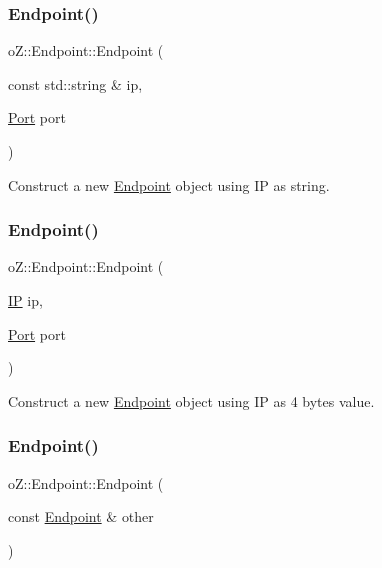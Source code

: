 \subsubsection{\texorpdfstring{Endpoint()}{Endpoint()}\hspace{0.1cm}{\footnotesize\ttfamily [2/4]}}
{\footnotesize\ttfamily o\+Z\+::\+Endpoint\+::\+Endpoint (\begin{DoxyParamCaption}\item[{const std\+::string \&}]{ip,  }\item[{\mbox{\hyperlink{namespaceo_z_afeccb82d451972ba3b7d2a32b066b30b}{Port}}}]{port }\end{DoxyParamCaption})\hspace{0.3cm}{\ttfamily [inline]}}



Construct a new \mbox{\hyperlink{classo_z_1_1_endpoint}{Endpoint}} object using IP as string. 

\mbox{\label{classo_z_1_1_endpoint_a7dd91554b61824eac5e0b015fa12f957}} 
\subsubsection{\texorpdfstring{Endpoint()}{Endpoint()}\hspace{0.1cm}{\footnotesize\ttfamily [3/4]}}
{\footnotesize\ttfamily o\+Z\+::\+Endpoint\+::\+Endpoint (\begin{DoxyParamCaption}\item[{\mbox{\hyperlink{namespaceo_z_ace55c2d0182a14ceea9649d0d0cf9c4a}{IP}}}]{ip,  }\item[{\mbox{\hyperlink{namespaceo_z_afeccb82d451972ba3b7d2a32b066b30b}{Port}}}]{port }\end{DoxyParamCaption})\hspace{0.3cm}{\ttfamily [inline]}}



Construct a new \mbox{\hyperlink{classo_z_1_1_endpoint}{Endpoint}} object using IP as 4 bytes value. 

\mbox{\label{classo_z_1_1_endpoint_a71e0ae21c68532120f0aa6a988594279}} 
\subsubsection{\texorpdfstring{Endpoint()}{Endpoint()}\hspace{0.1cm}{\footnotesize\ttfamily [4/4]}}
{\footnotesize\ttfamily o\+Z\+::\+Endpoint\+::\+Endpoint (\begin{DoxyParamCaption}\item[{const \mbox{\hyperlink{classo_z_1_1_endpoint}{Endpoint}} \&}]{other }\end{DoxyParamCaption})\hspace{0.3cm}{\ttfamily [default]}}



